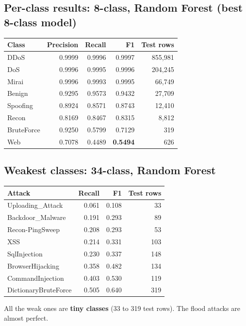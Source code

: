 \documentclass[11pt]{article}
\begin{document}
\subsection*{Per-class results: 8-class, Random Forest (best 8-class model)}
\begin{tabular}{@{}l r r r r@{}}
\toprule
\textbf{Class} & \textbf{Precision} & \textbf{Recall} & \textbf{F1} & \textbf{Test rows} \\
\midrule
DDoS & 0.9999 & 0.9996 & 0.9997 & 855,981 \\
DoS & 0.9996 & 0.9995 & 0.9996 & 204,245 \\
Mirai & 0.9996 & 0.9993 & 0.9995 & 66,749 \\
Benign & 0.9295 & 0.9573 & 0.9432 & 27,709 \\
Spoofing & 0.8924 & 0.8571 & 0.8743 & 12,410 \\
Recon & 0.8169 & 0.8467 & 0.8315 & 8,812 \\
BruteForce & 0.9250 & 0.5799 & 0.7129 & 319 \\
Web & 0.7078 & 0.4489 & \textbf{0.5494} & 626 \\
\bottomrule
\end{tabular}

\subsection*{Weakest classes: 34-class, Random Forest}
\begin{tabular}{@{}l r r r@{}}
\toprule
\textbf{Attack} & \textbf{Recall} & \textbf{F1} & \textbf{Test rows} \\
\midrule
Uploading\_Attack & 0.061 & 0.108 & 33 \\
Backdoor\_Malware & 0.191 & 0.293 & 89 \\
Recon-PingSweep & 0.208 & 0.293 & 53 \\
XSS & 0.214 & 0.331 & 103 \\
SqlInjection & 0.230 & 0.337 & 148 \\
BrowserHijacking & 0.358 & 0.482 & 134 \\
CommandInjection & 0.403 & 0.530 & 119 \\
DictionaryBruteForce & 0.505 & 0.640 & 319 \\
\bottomrule
\end{tabular}

All the weak ones are \textbf{tiny classes} (33 to 319 test rows). The flood attacks are almost perfect.

\newpage
\end{document}
